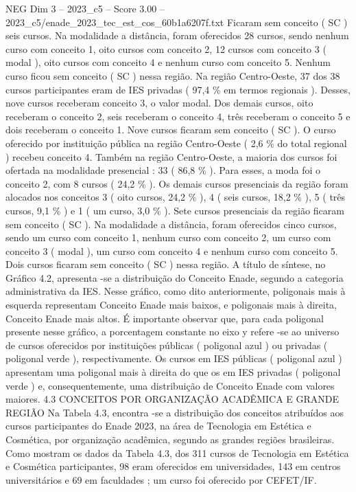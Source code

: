 \begin{textsample}{NEG Dim 3 – 2023\_c5 – Score 3.00 – 2023\_c5/enade\_2023\_tec\_est\_cos\_60b1a6207f.txt}
Ficaram sem conceito ( SC ) seis cursos.
Na modalidade a distância, foram oferecidos 28 cursos, sendo nenhum curso com conceito 1, oito cursos com conceito 2, 12 cursos com conceito 3 ( modal ), oito cursos com conceito 4 e nenhum curso com conceito 5.
Nenhum curso ficou sem conceito ( SC ) nessa região.
Na região Centro-Oeste, 37 dos 38 cursos participantes eram de IES privadas ( 97,4 \% em termos regionais ).
Desses, nove cursos receberam conceito 3, o valor modal.
Dos demais cursos, oito receberam o conceito 2, seis receberam o conceito 4, três receberam o conceito 5 e dois receberam o conceito 1.
Nove cursos ficaram sem conceito ( SC ).
O curso oferecido por instituição pública na região Centro-Oeste ( 2,6 \% do total regional ) recebeu conceito 4.
Também na região Centro-Oeste, a maioria dos cursos foi ofertada na modalidade presencial : 33 ( 86,8 \% ).
Para esses, a moda foi o conceito 2, com 8 cursos ( 24,2 \% ).
Os demais cursos presenciais da região foram alocados nos conceitos 3 ( oito cursos, 24,2 \% ), 4 ( seis cursos, 18,2 \% ), 5 ( três cursos, 9,1 \% ) e 1 ( um curso, 3,0 \% ).
Sete cursos presenciais da região ficaram sem conceito ( SC ).
Na modalidade a distância, foram oferecidos cinco cursos, sendo um curso com conceito 1, nenhum curso com conceito 2, um curso com conceito 3 ( modal ), um curso com conceito 4 e nenhum curso com conceito 5.
Dois cursos ficaram sem conceito ( SC ) nessa região.
A título de síntese, no Gráfico 4.2, apresenta -se a distribuição do Conceito Enade, segundo a categoria administrativa da IES.
Nesse gráfico, como dito anteriormente, poligonais mais à esquerda representam Conceito Enade mais baixos, e poligonais mais à direita, Conceito Enade mais altos.
É importante observar que, para cada poligonal presente nesse gráfico, a porcentagem constante no eixo y refere -se ao universo de cursos oferecidos por instituições públicas ( poligonal azul ) ou privadas ( poligonal verde ), respectivamente.
Os cursos em IES públicas ( poligonal azul ) apresentam uma poligonal mais à direita do que os em IES privadas ( poligonal verde ) e, consequentemente, uma distribuição de Conceito Enade com valores maiores. 4.3 CONCEITOS POR ORGANIZAÇÃO ACADÊMICA E GRANDE REGIÃO Na Tabela 4.3, encontra -se a distribuição dos conceitos atribuídos aos cursos participantes do Enade 2023, na área de Tecnologia em Estética e Cosmética, por organização acadêmica, segundo as grandes regiões brasileiras.
Como mostram os dados da Tabela 4.3, dos 311 cursos de Tecnologia em Estética e Cosmética participantes, 98 eram oferecidos em universidades, 143 em centros universitários e 69 em faculdades ; um curso foi oferecido por CEFET/IF.

\end{textsample}

